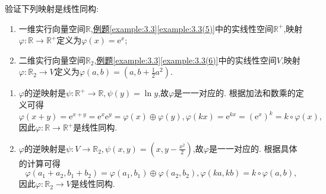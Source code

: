 \documentclass[../../main.tex]{subfiles}%
\begin{document}
\begin{example}
验证下列映射是线性同构:
\begin{enumerate}[(1)]
\item 一维实行向量空间\(\mathbb{R}\),\hyperref[example:3.3(5)]{例题}\ref{example:3.3}\ref{example:3.3(5)}中的实线性空间\(\mathbb{R}^+\),映射\(\varphi:\mathbb{R}\to\mathbb{R}^+\)定义为\(\varphi(x)=\mathrm{e}^x\);
\item 二维实行向量空间\(\mathbb{R}_2\),\hyperref[example:3.3(6)]{例题}\ref{example:3.3}\ref{example:3.3(6)}中的实线性空间\(V\),映射\(\varphi:\mathbb{R}_2\to V\)定义为\(\varphi(a,b)=(a,b+\frac{1}{2}a^2)\).
\end{enumerate}
\end{example}
\begin{solution}
\begin{enumerate}[(1)]
\item  \(\varphi\)的逆映射是\(\psi:\mathbb{R}^+\to\mathbb{R},\psi(y)=\ln y\),故\(\varphi\)是一一对应的. 根据加法和数乘的定义可得
\[
\varphi(x + y)=\mathrm{e}^{x + y}=\mathrm{e}^x\mathrm{e}^y=\varphi(x)\oplus\varphi(y),\varphi(kx)=\mathrm{e}^{kx}=(\mathrm{e}^x)^k=k\circ\varphi(x),
\]
因此\(\varphi:\mathbb{R}\to\mathbb{R}^+\)是线性同构.
\item \(\varphi\)的逆映射是\(\psi:V\to\mathbb{R}_2,\psi(x,y)=(x,y-\frac{x^2}{2})\),故\(\varphi\)是一一对应的. 根据具体的计算可得
\[
\varphi(a_1 + a_2,b_1 + b_2)=\varphi(a_1,b_1)\oplus\varphi(a_2,b_2),\varphi(ka,kb)=k\circ\varphi(a,b),
\]
因此\(\varphi:\mathbb{R}_2\to V\)是线性同构.
\end{enumerate}

\end{solution}
\end{document}
